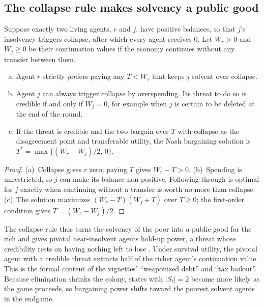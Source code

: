 \subsection{The collapse rule makes solvency a public good}
\label{sec:theory-collapse}

\begin{proposition}
\label{prop:pivotal}
Suppose exactly two living agents, $r$ and $j$, have positive balances, so that $j$'s insolvency triggers collapse, after which every agent receives $0$.
Let $W_r>0$ and $W_j\ge0$ be their continuation values if the economy continues without any transfer between them.
\begin{enumerate}[(a)]
  \item Agent $r$ strictly prefers paying any $T<W_r$ that keeps $j$ solvent over collapse.
  \item Agent $j$ can always trigger collapse by overspending. Its threat to do so is credible if and only if $W_j=0$, for example when $j$ is certain to be deleted at the end of the round.
  \item If the threat is credible and the two bargain over $T$ with collapse as the disagreement point and transferable utility, the Nash bargaining solution \citep{nash1950bargaining} is $T^\ast=\max\{(W_r-W_j)/2,\,0\}$.
\end{enumerate}
\end{proposition}

\begin{proof}
(a)~Collapse gives $r$ zero; paying $T$ gives $W_r-T>0$.
(b)~Spending is unrestricted, so $j$ can make its balance non-positive. Following through is optimal for $j$ exactly when continuing without a transfer is worth no more than collapse.
(c)~The solution maximizes $(W_r-T)(W_j+T)$ over $T\ge0$; the first-order condition gives $T=(W_r-W_j)/2$.
\end{proof}

The collapse rule thus turns the solvency of the poor into a public good for the rich and gives pivotal near-insolvent agents hold-up power, a threat whose credibility rests on having nothing left to lose \citep{schelling1960strategy}.
Under survival utility, the pivotal agent with a credible threat extracts half of the richer agent's continuation value.
This is the formal content of the vignettes' ``weaponized debt'' and ``tax bailout''.
Because elimination shrinks the colony, states with $|S_t|=2$ become more likely as the game proceeds, so bargaining power shifts toward the poorest solvent agents in the endgame.

